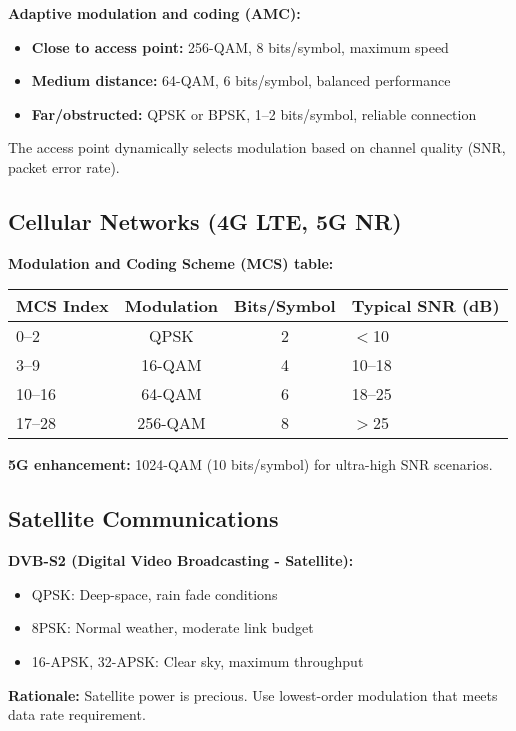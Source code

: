 \textbf{Adaptive modulation and coding (AMC):}
\begin{itemize}
\item \textbf{Close to access point:} 256-QAM, 8 bits/symbol, maximum speed
\item \textbf{Medium distance:} 64-QAM, 6 bits/symbol, balanced performance
\item \textbf{Far/obstructed:} QPSK or BPSK, 1--2 bits/symbol, reliable connection
\end{itemize}

The access point dynamically selects modulation based on channel quality (SNR, packet error rate).

\subsection{Cellular Networks (4G LTE, 5G NR)}

\textbf{Modulation and Coding Scheme (MCS) table:}

\begin{center}
\begin{tabular}{@{}lccl@{}}
\toprule
MCS Index & Modulation & Bits/Symbol & Typical SNR (dB) \\
\midrule
0--2 & QPSK & 2 & $<$10 \\
3--9 & 16-QAM & 4 & 10--18 \\
10--16 & 64-QAM & 6 & 18--25 \\
17--28 & 256-QAM & 8 & $>$25 \\
\bottomrule
\end{tabular}
\end{center}

\textbf{5G enhancement:} 1024-QAM (10 bits/symbol) for ultra-high SNR scenarios.

\subsection{Satellite Communications}

\textbf{DVB-S2 (Digital Video Broadcasting - Satellite):}
\begin{itemize}
\item QPSK: Deep-space, rain fade conditions
\item 8PSK: Normal weather, moderate link budget
\item 16-APSK, 32-APSK: Clear sky, maximum throughput
\end{itemize}

\textbf{Rationale:} Satellite power is precious. Use lowest-order modulation that meets data rate requirement.

